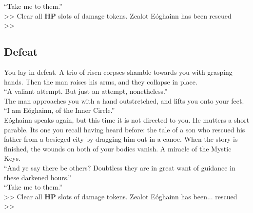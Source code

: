 “Take me to them.”\\

>> Clear all \textbf{HP} slots of damage tokens.
 Zealot Eóghainn has been rescued\\
>> 

\subsection*{Defeat}
You lay in defeat. A trio of risen corpses shamble towards you with grasping hands. Then the man raises his arms, and they collapse in place.\\

“A valiant attempt. But just an attempt, nonetheless.”\\

The man approaches you with a hand outstretched, and lifts you onto your feet.\\

“I am Eóghainn, of the Inner Circle.”\\

Eóghainn speaks again, but this time it is not directed to you. He mutters a short parable. Its one you recall having heard before: the tale of a son who rescued his father from a besieged city by dragging him out in a canoe. When the story is finished, the wounds on both of your bodies vanish. A miracle of the Mystic Keys.\\

“And ye say there be others? Doubtless they are in great want of guidance in these darkened hours.”\\

“Take me to them.”\\

>> Clear all \textbf{HP} slots of damage tokens.
 Zealot Eóghainn has been... rescued\\
>> 